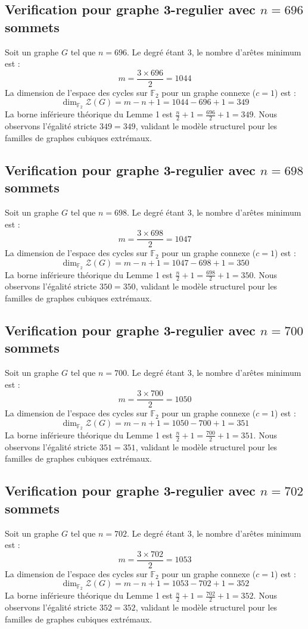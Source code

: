 \documentclass[11pt,a4paper]{article}
\begin{document}
\subsection{Verification pour graphe 3-regulier avec $n=696$ sommets}
Soit un graphe $G$ tel que $n = 696$. Le degré étant 3, le nombre d'arêtes minimum est :
$$ m = \frac{3 \times 696}{2} = 1044 $$
La dimension de l'espace des cycles sur $\mathbb{F}_2$ pour un graphe connexe ($c=1$) est :
$$ \dim_{\mathbb{F}_2} \mathcal{Z}(G) = m - n + 1 = 1044 - 696 + 1 = 349 $$
La borne inférieure théorique du Lemme 1 est $\frac{n}{2} + 1 = \frac{696}{2} + 1 = 349$.
Nous observons l'égalité stricte $349 = 349$, validant le modèle structurel pour les familles de graphes cubiques extrémaux.

\subsection{Verification pour graphe 3-regulier avec $n=698$ sommets}
Soit un graphe $G$ tel que $n = 698$. Le degré étant 3, le nombre d'arêtes minimum est :
$$ m = \frac{3 \times 698}{2} = 1047 $$
La dimension de l'espace des cycles sur $\mathbb{F}_2$ pour un graphe connexe ($c=1$) est :
$$ \dim_{\mathbb{F}_2} \mathcal{Z}(G) = m - n + 1 = 1047 - 698 + 1 = 350 $$
La borne inférieure théorique du Lemme 1 est $\frac{n}{2} + 1 = \frac{698}{2} + 1 = 350$.
Nous observons l'égalité stricte $350 = 350$, validant le modèle structurel pour les familles de graphes cubiques extrémaux.

\subsection{Verification pour graphe 3-regulier avec $n=700$ sommets}
Soit un graphe $G$ tel que $n = 700$. Le degré étant 3, le nombre d'arêtes minimum est :
$$ m = \frac{3 \times 700}{2} = 1050 $$
La dimension de l'espace des cycles sur $\mathbb{F}_2$ pour un graphe connexe ($c=1$) est :
$$ \dim_{\mathbb{F}_2} \mathcal{Z}(G) = m - n + 1 = 1050 - 700 + 1 = 351 $$
La borne inférieure théorique du Lemme 1 est $\frac{n}{2} + 1 = \frac{700}{2} + 1 = 351$.
Nous observons l'égalité stricte $351 = 351$, validant le modèle structurel pour les familles de graphes cubiques extrémaux.

\subsection{Verification pour graphe 3-regulier avec $n=702$ sommets}
Soit un graphe $G$ tel que $n = 702$. Le degré étant 3, le nombre d'arêtes minimum est :
$$ m = \frac{3 \times 702}{2} = 1053 $$
La dimension de l'espace des cycles sur $\mathbb{F}_2$ pour un graphe connexe ($c=1$) est :
$$ \dim_{\mathbb{F}_2} \mathcal{Z}(G) = m - n + 1 = 1053 - 702 + 1 = 352 $$
La borne inférieure théorique du Lemme 1 est $\frac{n}{2} + 1 = \frac{702}{2} + 1 = 352$.
Nous observons l'égalité stricte $352 = 352$, validant le modèle structurel pour les familles de graphes cubiques extrémaux.
\end{document}

